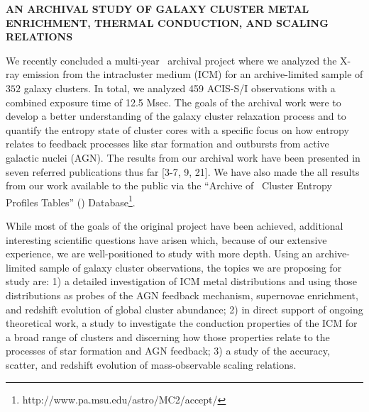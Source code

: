 \documentclass[letterpaper,11pt]{article}
\begin{document}
\pagestyle{plain}


\begin{center} 
\bfseries\uppercase{An Archival Study of Galaxy Cluster Metal
  Enrichment, Thermal Conduction, and Scaling Relations}
\end{center}

We recently concluded a multi-year \chandra\ archival project where we
analyzed the X-ray emission from the intracluster medium (ICM) for an
archive-limited sample of $352$ galaxy clusters. In total, we analyzed
459 ACIS-S/I observations with a combined exposure time of 12.5
Msec. The goals of the archival work were to develop a better
understanding of the galaxy cluster relaxation process and to quantify
the entropy state of cluster cores with a specific focus on how
entropy relates to feedback processes like star formation and
outbursts from active galactic nuclei (AGN). The results from our
archival work have been presented in seven referred publications thus
far [3-7, 9, 21]. We have also made the all results from our work
available to the public via the ``Archive of \chandra\ Cluster Entropy
Profiles Tables'' (\accept)
Database\footnote{http://www.pa.msu.edu/astro/MC2/accept/}.

While most of the goals of the original project have been achieved,
additional interesting scientific questions have arisen which, because
of our extensive experience, we are well-positioned to study with more
depth. Using an archive-limited sample of galaxy cluster observations,
the topics we are proposing for study are: 1) a detailed investigation
of ICM metal distributions and using those distributions as probes of
the AGN feedback mechanism, supernovae enrichment, and redshift
evolution of global cluster abundance; 2) in direct support of ongoing
theoretical work, a study to investigate the conduction properties of
the ICM for a broad range of clusters and discerning how those
properties relate to the processes of star formation and AGN feedback;
3) a study of the accuracy, scatter, and redshift evolution of
mass-observable scaling relations.

\large
\begin{center}
\end{center}
\normalsize
\end{document}
